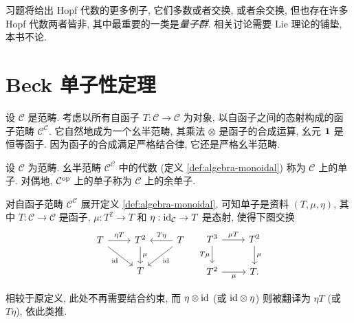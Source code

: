 习题将给出 Hopf 代数的更多例子, 它们多数或者交换, 或者余交换, 但也存在许多 Hopf 代数两者皆非, 其中最重要的一类是\emph{量子群}. 相关讨论需要 Lie 理论的铺垫, 本书不论.

\section{Beck 单子性定理}\label{sec:Beck}
设 $\mathcal{C}$ 是范畴. 考虑以所有自函子 $T: \mathcal{C} \to \mathcal{C}$ 为对象, 以自函子之间的态射构成的函子范畴 $\mathcal{C}^{\mathcal{C}}$. 它自然地成为一个幺半范畴, 其乘法 $\otimes$ 是函子的合成运算, 幺元 $\bm{1}$ 是恒等函子. 因为函子的合成满足严格结合律, 它还是严格幺半范畴.

\begin{definition}[单子和余单子]\label{def:monad}
	设 $\mathcal{C}$ 为范畴. 幺半范畴 $\mathcal{C}^{\mathcal{C}}$ 中的代数 (定义 \ref{def:algebra-monoidal}) 称为 $\mathcal{C}$ 上的单子. 对偶地, $\mathcal{C}^{\operatorname{op}}$ 上的单子称为 $\mathcal{C}$ 上的余单子.
\end{definition}

对自函子范畴 $\mathcal{C}^{\mathcal{C}}$ 展开定义 \ref{def:algebra-monoidal}, 可知单子是资料 $(T, \mu, \eta)$, 其中 $T: \mathcal{C} \to \mathcal{C}$ 是函子, $\mu: T^2 \to T$ 和 $\eta: \mathrm{id}_{\mathcal{C}} \to T$ 是态射, 使得下图交换
\begin{equation*}\begin{gathered}
	\begin{tikzcd}
		T \arrow[r, "{\eta T}"] \arrow[rd, "\identity"'] & T^2 \arrow[d, "\mu"] & T \arrow[l, "{T\eta}"'] \arrow[ld, "\identity"] \\
		& T &
	\end{tikzcd} \quad
	\begin{tikzcd}
		T^3 \arrow[r, "\mu T"] \arrow[d, "T\mu"'] & T^2 \arrow[d, "\mu"] \\
		T^2 \arrow[r, "\mu"'] & T.
	\end{tikzcd}
\end{gathered}\end{equation*}

相较于原定义, 此处不再需要结合约束, 而 $\eta \otimes \mathrm{id}$ (或 $\mathrm{id} \otimes \eta$) 则被翻译为 $\eta T$ (或 $T\eta$), 依此类推.

